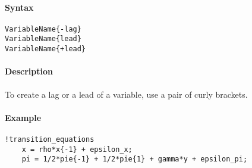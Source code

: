 


	\paragraph{Syntax}

\begin{verbatim}
VariableName{-lag}
VariableName{lead}
VariableName{+lead}
\end{verbatim}

\paragraph{Description}

To create a lag or a lead of a variable, use a pair of curly brackets.

\paragraph{Example}

\begin{verbatim}
!transition_equations
    x = rho*x{-1} + epsilon_x;
    pi = 1/2*pie{-1} + 1/2*pie{1} + gamma*y + epsilon_pi;
\end{verbatim}


